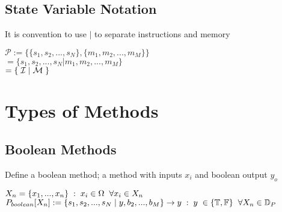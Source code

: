 \documentclass[11pt]{article}
\begin{document}
\subsection{State Variable Notation}
It is convention to use $|$ to separate instructions and memory 
\begin{center}
$
\mathcal{P} := \{ \{s_1, s_2,...,s_{N}\},\{ m_1, m_2,...,m_M \} \}
$
\\ \vspace{2mm}
$
= \{ s_1, s_2,...,s_{N} | m_1, m_2,...,m_M\}
$
\\ \vspace{2mm}
$
= \{\hspace{1mm} \mathcal{I} \hspace{1mm}|\hspace{1mm} \mathcal{M} \hspace{1mm} \}
$
\end{center}




\section{Types of Methods} 

\subsection{Boolean Methods}
Define a boolean method; a method with inputs $x_i$ and boolean output $y_o$
\begin{center}
$
X_n = \{x_1,...,x_n\} \hspace{1mm} : \hspace{1mm} x_i \in \Omega \hspace{2mm} \forall x_i \in X_n
$
\\ \vspace{2mm}
$
P_{boolean}\lbrack X_n \rbrack := \{ s_1,s_2,...,s_{N}\hspace{1mm}|\hspace{1mm} y, b_2,...,b_M\} \rightarrow y \hspace{1mm} : \hspace{1mm} y \hspace{1mm} \in  \{\mathbb{T},\mathbb{F}\} \hspace{2mm} \forall X_n \in \mathbb{D}_{P}
$
\end{center}
\end{document}
